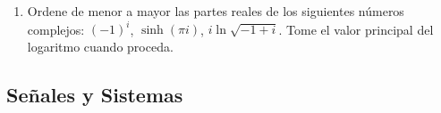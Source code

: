 \documentclass[letterpaper, 12pt]{article}
\newif\ifanswers
\begin{document}
\begin{enumerate}

    \item Ordene de menor a mayor las partes reales de los siguientes números complejos: \( (-1)^i \), \( \sinh(\pi i) \), \( i\ln\sqrt{-1+i} \). Tome el valor principal del logaritmo cuando proceda.

    \ifanswers
  {\color{red}  \textbf{Solución:}
  
    Para calcular la parte real, expresamos los números complejos en forma cartesiana:
    \[
    (-1)^i = e^{i\ln(-1)} = e^{i(\ln |1| + i\pi)} = e^{-\pi}
    \]
    \[
    \sinh(\pi i) = i\sin\pi = 0
    \]
    \[
    i\ln\sqrt{-1+i} = \frac{i}{2}\ln(-1+i) = \frac{i}{2}\left(\ln\sqrt{2} + i\frac{3\pi}{4}\right) = -\frac{3\pi}{8} + i\frac{1}{4}\ln 2
    \]
    Luego, \( \Re[i\ln\sqrt{-1+i}] < \Re [\sinh(\pi i)] < \Re [(-1)^i] \).
   }
    \fi
    
    
    
\end{enumerate}

\subsection*{Señales y Sistemas}
\end{document}
